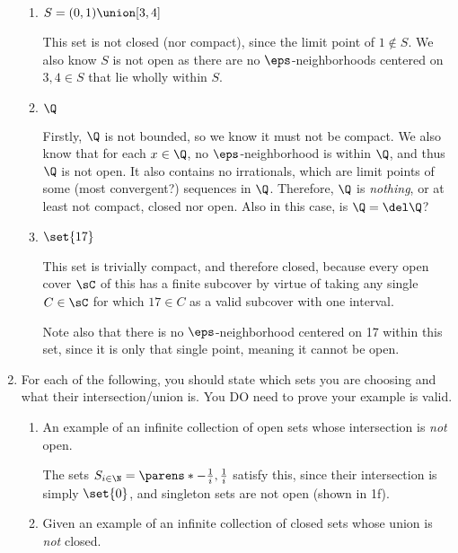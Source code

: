 \documentclass{article}
\begin{document}
\begin{enumerate}
\begin{enumerate}
          \item $S = (0, 1) \union [3, 4]$

                This set is not closed (nor compact), since the limit point of $1 \notin S$.
                We also know $S$ is not open as there are no $\eps$-neighborhoods centered on $3, 4 \in S$
                that lie wholly within $S$.

          \item $\Q$

                Firstly, $\Q$ is not bounded, so we know it must not be compact.
                We also know that for each $x \in \Q$, no $\eps$-neighborhood is within $\Q$, and thus $\Q$ is not open.
                It also contains no irrationals, which are limit points of some (most convergent?) sequences in $\Q$. Therefore,
                $\Q$ is \emph{nothing}, or at least not compact, closed nor open. Also in this case, is $\Q = \del\Q$?

          \item $\set{17}$

                This set is trivially compact, and therefore closed, because every open cover $\sC$ of this has a finite subcover by virtue of
                taking any single $C \in \sC$ for which $17 \in C$ as a valid subcover with one interval.

                Note also that there is no $\eps$-neighborhood centered on 17 within this set, since it is only that single point,
                meaning it cannot be open.
        \end{enumerate}

  \item For each of the following, you should state which sets you are choosing and what their intersection/union is.
        You DO need to prove your example is valid.

        \begin{enumerate}

          \item An example of an infinite collection of open sets whose intersection is \emph{not} open.

                The sets $S_{i \in \N} = \parens*{-\frac{1}{i}, \frac{1}{i}}$ satisfy this, since their intersection is simply $\set{0}$, and
                singleton sets are not open (shown in 1f).

          \item Given an example of an infinite collection of closed sets whose union is \emph{not} closed.


\end{enumerate}
\end{enumerate}
\end{document}
